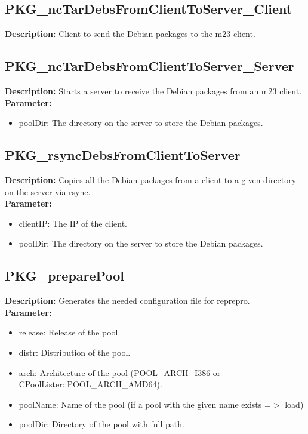 \subsection{PKG\_ncTarDebsFromClientToServer\_Client}
\textbf{Description:} Client to send the Debian packages to the m23 client.\\

\subsection{PKG\_ncTarDebsFromClientToServer\_Server}
\textbf{Description:} Starts a server to receive the Debian packages from an m23 client.\\
\textbf{Parameter:}
\begin{itemize}
\item poolDir: The directory on the server to store the Debian packages.
\end{itemize}

\subsection{PKG\_rsyncDebsFromClientToServer}
\textbf{Description:} Copies all the Debian packages from a client to a given directory on the server via rsync.\\
\textbf{Parameter:}
\begin{itemize}
\item clientIP: The IP of the client.
\item poolDir: The directory on the server to store the Debian packages.
\end{itemize}

\subsection{PKG\_preparePool}
\textbf{Description:} Generates the needed configuration file for reprepro.\\
\textbf{Parameter:}
\begin{itemize}
\item release: Release of the pool.
\item distr: Distribution of the pool.
\item arch: Architecture of the pool (POOL\_ARCH\_I386 or CPoolLister::POOL\_ARCH\_AMD64).
\item poolName: Name of the pool (if a pool with the given name exists =$>$ load)
\item poolDir: Directory of the pool with full path.
\end{itemize}

